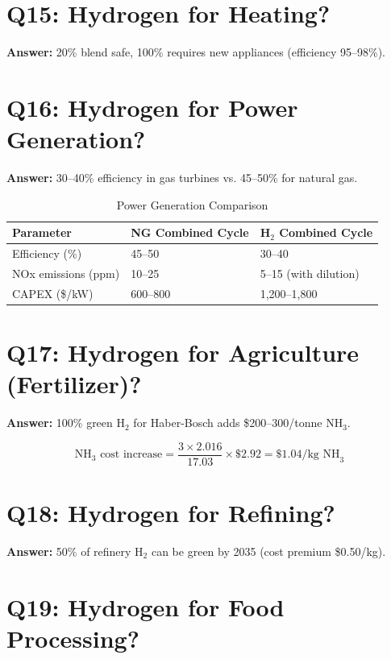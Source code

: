 \documentclass[12pt,twoside,openany]{book}
\begin{document}
\section{Q15: Hydrogen for Heating?}

\textbf{Answer:} 20\% blend safe, 100\% requires new appliances (efficiency 95--98\%).

\section{Q16: Hydrogen for Power Generation?}

\textbf{Answer:} 30--40\% efficiency in gas turbines vs. 45--50\% for natural gas.

\begin{table}[htbp]
    \centering
    \caption{Power Generation Comparison}
    \label{tab:power}
    \begin{tabular}{L{4cm} C{2.5cm} C{2.5cm}}
    \hline
    \textbf{Parameter} & \textbf{NG Combined Cycle} & \textbf{H$_2$ Combined Cycle} \\
    \hline
    Efficiency (\%) & 45--50 & 30--40 \\
    NOx emissions (ppm) & 10--25 & 5--15 (with dilution) \\
    CAPEX (\$/kW) & 600--800 & 1,200--1,800 \\
    \hline
    \end{tabular}
\end{table}

\section{Q17: Hydrogen for Agriculture (Fertilizer)?}

\textbf{Answer:} 100\% green H$_2$ for Haber-Bosch adds \$200--300/tonne NH$_3$.

\begin{dmath}
\text{NH}_3 \text{ cost increase} = \frac{3 \times 2.016}{17.03} \times \$2.92 = \$1.04/\text{kg NH}_3
\end{dmath}

\section{Q18: Hydrogen for Refining?}

\textbf{Answer:} 50\% of refinery H$_2$ can be green by 2035 (cost premium \$0.50/kg).

\section{Q19: Hydrogen for Food Processing?}
\end{document}
